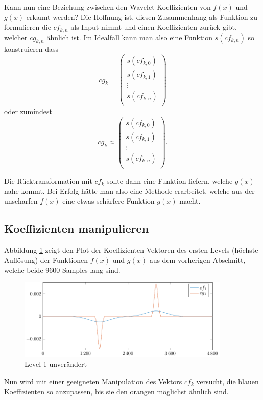 Kann nun eine Beziehung zwischen den Wavelet-Koeffizienten von $f(x)$ und $g(x)$ erkannt werden?
Die Hoffnung ist, diesen Zusammenhang als Funktion zu formulieren die $cf_{k,n}$ als Input nimmt und einen Koeffizienten zurück gibt, welcher $cg_{k,n}$ ähnlich ist.
Im Idealfall kann man also eine Funktion $s(cf_{k,n})$ so konstruieren dass
$$cg_k = \left(\begin{array}{c}
	s(cf_{k,0})\\
	s(cf_{k,1})\\
	\vdots\\
	s(cf_{k,n})\\
\end{array} \right)$$
oder zumindest
$$cg_k \approx \left(\begin{array}{c}
	s(cf_{k,0})\\
	s(cf_{k,1})\\
	\vdots\\
	s(cf_{k,n})\\
\end{array} \right).$$

Die Rücktransformation mit $cf_k$ sollte dann eine Funktion liefern, welche $g(x)$ nahe kommt.
Bei Erfolg hätte man also eine Methode erarbeitet, welche aus der \glqq unscharfen\grqq{} $f(x)$ eine etwas \glqq schärfere\grqq{} Funktion $g(x)$ macht. 

\subsection{Koeffizienten manipulieren}
Abbildung \ref{deconvolve:level1} zeigt den Plot der Koeffizienten-Vektoren des ersten Levels (höchste Auflösung) der Funktionen $f(x)$ und $g(x)$ aus dem vorherigen Abschnitt, welche beide 9600 Samples lang sind.
\begin{figure}[h]
\centering
\includegraphics[width=0.9\textwidth]{./papers/deconvolve/pictures/level/level1.pdf}
\caption{Level 1 unverändert\label{deconvolve:level1}}
\end{figure}

Nun wird mit einer geeigneten Manipulation des Vektors $cf_k$ versucht, die blauen Koeffizienten so anzupassen, bis sie den orangen möglichst ähnlich sind.


